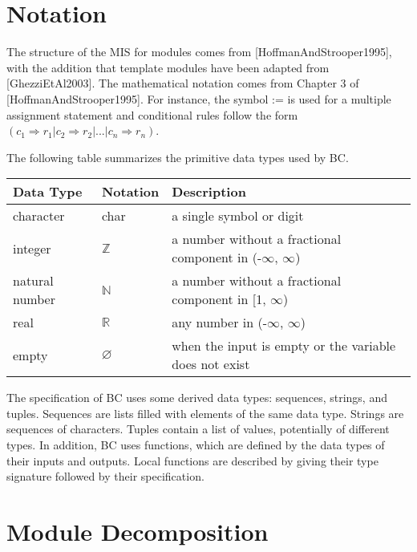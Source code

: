 \documentclass[12pt, titlepage]{article}
\begin{document}
\section{Notation}


The structure of the MIS for modules comes from [HoffmanAndStrooper1995],
with the addition that template modules have been adapted from
[GhezziEtAl2003].  The mathematical notation comes from Chapter 3 of
[HoffmanAndStrooper1995].  For instance, the symbol := is used for a
multiple assignment statement and conditional rules follow the form $(c_1
\Rightarrow r_1 | c_2 \Rightarrow r_2 | ... | c_n \Rightarrow r_n )$.

The following table summarizes the primitive data types used by BC. 
\begin{center}
\renewcommand{\arraystretch}{1.2}
\noindent 
\begin{tabular}{l l p{7.5cm}} 
\toprule 
\textbf{Data Type} & \textbf{Notation} & \textbf{Description}\\ 
\midrule
character & char & a single symbol or digit\\
integer & $\mathbb{Z}$ & a number without a fractional component in (-$\infty$, $\infty$) \\
natural number & $\mathbb{N}$ & a number without a fractional component in [1, $\infty$) \\
real & $\mathbb{R}$ & any number in (-$\infty$, $\infty$)\\
empty & $\varnothing$ & when the input is empty or the variable does not exist \\
\bottomrule
\end{tabular} 
\end{center}

\noindent
The specification of BC uses some derived data types: sequences, strings, and
tuples. Sequences are lists filled with elements of the same data type. Strings
are sequences of characters. Tuples contain a list of values, potentially of
different types. In addition, BC uses functions, which
are defined by the data types of their inputs and outputs. Local functions are
described by giving their type signature followed by their specification.

\section{Module Decomposition}
\end{document}
